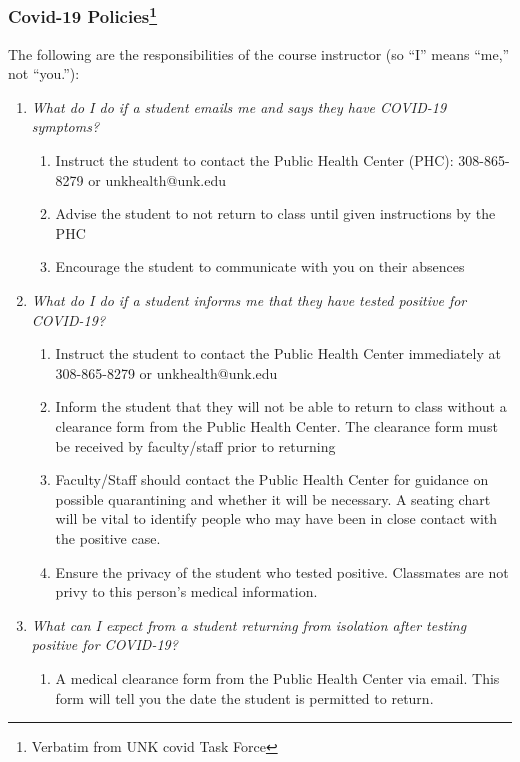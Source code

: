 \documentclass[12pt]{article}
\newcounter{ex}\setcounter{ex}{0}
\newcounter{cy}\setcounter{cy}{\the\year}
\begin{document}
\subsubsection*{Covid-19 Policies\footnote{Verbatim from UNK covid Task Force}}

The following are the responsibilities of the course instructor (so ``I'' means ``me,''  not ``you.''):

\begin{enumerate}
\item \emph{What do I do if a student emails me and says they have COVID-19 symptoms?}
\begin{enumerate}
\item	Instruct the student to contact the Public Health Center (PHC): 308-865-8279 or unkhealth@unk.edu
\item	Advise the student to not return to class until given instructions by the PHC
\item	Encourage the student to communicate with you on their absences
\end{enumerate}

\item \emph{What do I do if a student informs me that they have tested positive for COVID-19?}
\begin{enumerate}
\item	Instruct the student to contact the Public Health Center immediately at 308-865-8279 or unkhealth@unk.edu
\item	Inform the student that they will not be able to return to class without a clearance form from the Public Health Center. The clearance form must be received by faculty/staff prior to returning
\item	Faculty/Staff should contact the Public Health Center for guidance on possible quarantining and whether it will be necessary. A seating chart will be vital to identify people who may have been in close contact with the positive case.
\item	Ensure the privacy of the student who tested positive. Classmates are not privy to this person’s medical information.
\end{enumerate}

\item \emph{What can I expect from a student returning from isolation after testing positive for COVID-19?}
\begin{enumerate}
\item 	A medical clearance form from the Public Health Center via email. This form will tell you the date the student is permitted to return.
\end{enumerate}


\end{enumerate}
\end{document}

